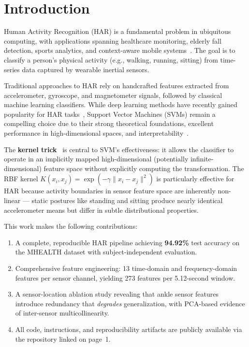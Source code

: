 \documentclass[10pt,twocolumn,letterpaper]{article}
\begin{document}
\section{Introduction}

Human Activity Recognition (HAR) is a fundamental problem in ubiquitous computing, with applications spanning healthcare monitoring, elderly fall detection, sports analytics, and context-aware mobile systems~\cite{bulling2014tutorial}. The goal is to classify a person's physical activity (e.g., walking, running, sitting) from time-series data captured by wearable inertial sensors.

Traditional approaches to HAR rely on handcrafted features extracted from accelerometer, gyroscope, and magnetometer signals, followed by classical machine learning classifiers. While deep learning methods have recently gained popularity for HAR tasks~\cite{ordonez2016deep, khatun2022deep}, Support Vector Machines (SVMs) remain a compelling choice due to their strong theoretical foundations, excellent performance in high-dimensional spaces, and interpretability~\cite{vapnik1995nature}.

The \textbf{kernel trick}~\cite{scholkopf2002learning} is central to SVM's effectiveness: it allows the classifier to operate in an implicitly mapped high-dimensional (potentially infinite-dimensional) feature space without explicitly computing the transformation. The RBF kernel $K(x_i, x_j) = \exp(-\gamma \|x_i - x_j\|^2)$ is particularly effective for HAR because activity boundaries in sensor feature space are inherently non-linear --- static postures like standing and sitting produce nearly identical accelerometer means but differ in subtle distributional properties.

This work makes the following contributions:
\begin{enumerate}
    \item A complete, reproducible HAR pipeline achieving \textbf{94.92\%} test accuracy on the MHEALTH dataset with subject-independent evaluation.
    \item Comprehensive feature engineering: 13 time-domain and frequency-domain features per sensor channel, yielding 273 features per 5.12-second window.
    \item A sensor-location ablation study revealing that ankle sensor features introduce redundancy that \textit{degrades} generalization, with PCA-based evidence of inter-sensor multicollinearity.
    \item All code, instructions, and reproducibility artifacts are publicly available via the repository linked on page~1.
\end{enumerate}
\end{document}
